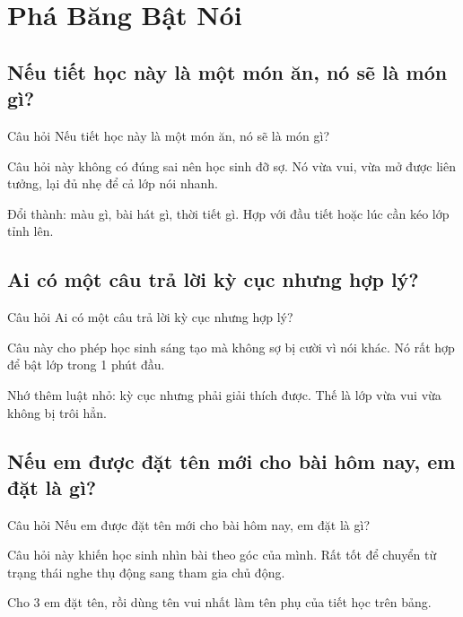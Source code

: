 \chapter{Phá Băng Bật Nói}

\section{Nếu tiết học này là một món ăn, nó sẽ là món gì?}
\begin{cauhoibox}{Câu hỏi}
Nếu tiết học này là một món ăn, nó sẽ là món gì?
\end{cauhoibox}
\begin{taisaocoich}
Câu hỏi này không có đúng sai nên học sinh đỡ sợ. Nó vừa vui, vừa mở được liên tưởng, lại đủ nhẹ để cả lớp nói nhanh.
\end{taisaocoich}
\begin{goiybien}
Đổi thành: màu gì, bài hát gì, thời tiết gì. Hợp với đầu tiết hoặc lúc cần kéo lớp tỉnh lên.
\end{goiybien}
\ngancach

\section{Ai có một câu trả lời kỳ cục nhưng hợp lý?}
\begin{cauhoibox}{Câu hỏi}
Ai có một câu trả lời kỳ cục nhưng hợp lý?
\end{cauhoibox}
\begin{taisaocoich}
Câu này cho phép học sinh sáng tạo mà không sợ bị cười vì nói khác. Nó rất hợp để bật lớp trong 1 phút đầu.
\end{taisaocoich}
\begin{goiybien}
Nhớ thêm luật nhỏ: kỳ cục nhưng phải giải thích được. Thế là lớp vừa vui vừa không bị trôi hẳn.
\end{goiybien}
\ngancach

\section{Nếu em được đặt tên mới cho bài hôm nay, em đặt là gì?}
\begin{cauhoibox}{Câu hỏi}
Nếu em được đặt tên mới cho bài hôm nay, em đặt là gì?
\end{cauhoibox}
\begin{taisaocoich}
Câu hỏi này khiến học sinh nhìn bài theo góc của mình. Rất tốt để chuyển từ trạng thái nghe thụ động sang tham gia chủ động.
\end{taisaocoich}
\begin{goiybien}
Cho 3 em đặt tên, rồi dùng tên vui nhất làm tên phụ của tiết học trên bảng.
\end{goiybien}
\ngancach

